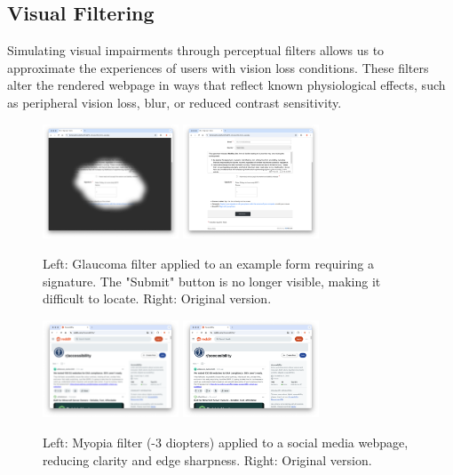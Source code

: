 \subsection{Visual Filtering}

Simulating visual impairments through perceptual filters allows us to approximate the experiences of users with vision loss conditions. These filters alter the rendered webpage in ways that reflect known physiological effects, such as peripheral vision loss, blur, or reduced contrast sensitivity.

\begin{figure}
    \centering
    \includegraphics[width=115pt]{imgs/glaucoma-filter.png}
    \includegraphics[width=115pt]{imgs/no-glaucoma-filter.png}
    \caption{Left: Glaucoma filter applied to an example form requiring a signature. The "Submit" button is no longer visible, making it difficult to locate. Right: Original version.}
    \vspace{-13pt}
    \label{fig:glaucoma-filters}
\end{figure}

\begin{figure}
    \centering
    \includegraphics[width=115pt]{imgs/myopia-filter.png}
    \includegraphics[width=115pt]{imgs/no-myopia-filter.png}
    \caption{Left: Myopia filter (-3 diopters) applied to a social media webpage, reducing clarity and edge sharpness. Right: Original version.}
    \vspace{-13pt}
    \label{fig:myopia-filters}
\end{figure}

